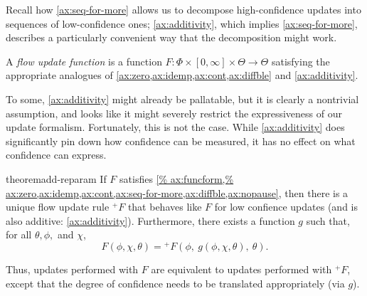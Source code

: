 Recall how \cref{ax:seq-for-more} allows us to decompose high-confidence updates into sequences of low-confidence ones;
\cref{ax:additivity},
which implies \cref{ax:seq-for-more}, describes a particularly convenient
way that the decomposition might work. 

\begin{defn}
	A \emph{flow update function}
	is a function
	$F : \Phi \times[0,\infty] \times \Theta\to \Theta$
	satisfying the appropriate analogues of
	\cref{ax:zero,ax:idemp,ax:cont,ax:diffble}
	and \cref{ax:additivity}.
\end{defn}

To some,
\cref{ax:additivity} might already be pallatable,
but it is clearly a nontrivial assumption, and looks like it might severely restrict the expressiveness of our update formalism.
Fortunately, this is not the case.
While \cref{ax:additivity} does significantly pin down how confidence 
can be measured, it has no effect on what confidence can express.  


\begin{linked}{theorem}{add-reparam}
	If $F$ satisfies \cref{%
		ax:funcform,%
		ax:zero,ax:idemp,ax:cont,ax:seq-for-more,ax:diffble,ax:nopause},
	then there is a unique 
	flow update rule
	 $^+\!F$
	that behaves like $F$ for low confience updates
	(and is also additive: \cref{ax:additivity}). 
	Furthermore, there exists a function 
	$g$ such that,
	for all $\theta,\phi,$ and $\chi$,
	\[
		F( \phi, 
			\chi,
		 \theta )
		 =
		{^+}\!F(\phi,~ 
		g(\phi,\chi,\theta),~
		 \theta).
	\]
\end{linked}
Thus, updates performed with $F$ are equivalent
to updates performed with ${^+}\!F$, except that
the degree of confidence needs to be translated appropriately (via $g$).



